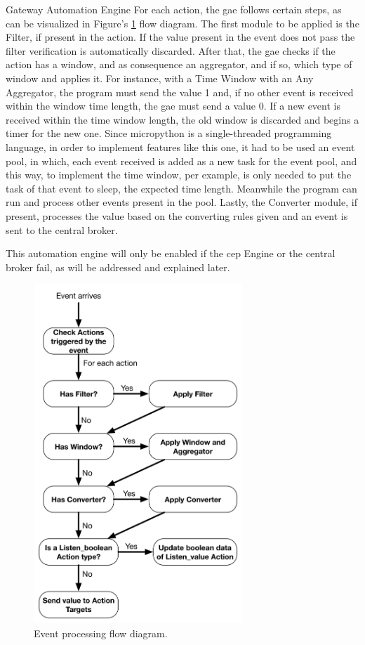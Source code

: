 \begin{Paragraph}{Gateway Automation Engine}
For each action, the \ac{gae} follows certain steps, as can be visualized in Figure's \ref{fig:action} flow diagram. The first module to be applied is the Filter, if present in the action. If the value present in the event does not pass the filter verification is automatically discarded. After that, the \ac{gae} checks if the action has a window, and as consequence an aggregator, and if so, which type of window and applies it. For instance, with a Time Window with an Any Aggregator, the program must send the value 1 and, if no other event is received within the window time length, the \ac{gae} must send a value 0. If a new event is received within the time window length, the old window is discarded and begins a timer for the new one. Since micropython is a single-threaded programming language, in order to implement features like this one, it had to be used an event pool, in which, each event received is added as a new task for the event pool, and this way, to implement the time window, per example, is only needed to put the task of that event to sleep, the expected time length. Meanwhile the program can run and process other events present in the pool. Lastly, the Converter module, if present, processes the value based on the converting rules given and an event is sent to the central broker. 

This automation engine will only be enabled if the \ac{cep} Engine or the central broker fail, as will be addressed and explained later.

\begin{figure}[]
	\centering
	\includegraphics[width=0.7\textwidth]{figures/action.png}
	\caption{Event processing flow diagram.}
	\label{fig:action}
\end{figure}

\end{Paragraph}

